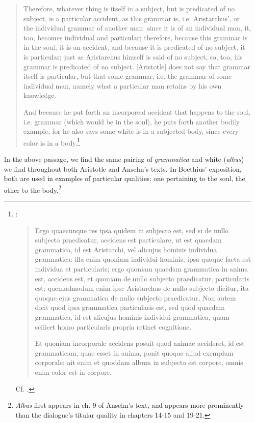 \documentclass[]{article}
\begin{document}
\begin{quote}
Therefore, whatever thing is itself in a subject, but is predicated of no subject, is a particular accident, as this grammar is, i.e. Aristarchus', or the individual grammar of another man: since it is of an individual man, it, too, becomes individual and particular; therefore, because this grammar is in the soul, it is an accident, and because it is predicated of no subject, it is particular; just as Aristarchus himself is said of no subject, so, too, his grammar is predicated of no subject. [Aristotle] does not say that grammar itself is particular, but that some grammar, i.e. the grammar of some individual man, namely what a particular man retains by his own knowledge.

And because he put forth an incorporeal accident that happens to the soul, i.e. grammar (which would be in the soul), he puts forth another bodily example; for he also says some white is in a subjected body, since every color is in a body.\footnote{\cite[BC 171D-172A]{BC}:
\begin{quote}
Ergo quaecunque res ipsa quidem in subjecto est, sed si de nullo subjecto praedicatur, accidens est particulare, ut est quaedam grammatica, id est Aristarchi, vel alicujus hominis individua grammatica: illa enim quoniam individui hominis, ipsa quoque facta est individua et particularis; ergo quoniam quaedam grammatica in anima est, accidens est, et quoniam de nullo subjecto praedicatur, particularis est; quemadmodum enim ipse Aristarchus de nullo subjecto dicitur, ita quoque ejus grammatica de nullo subjecto praedicatur. Non autem dicit quod ipsa grammatica particularis est, sed quod quaedam grammatica, id est alicujus hominis individui grammatica, quam scilicet homo particularis propria retinet cognitione. 

Et quoniam incorporale accidens posuit quod animae accideret, id est grammaticam, quae esset in anima, ponit quoque aliud exemplum corporale; ait enim et quoddam album in subjecto est corpore, omnis enim color est in corpore.
\end{quote}
Cf. \cite[BC 174A-175A; 246B-247B]{BC}.}
\end{quote}

In the above passage, we find the same pairing of \textit{grammatica} and white (\textit{albus}) we find throughout both Aristotle and Anselm's texts. In Boethius' exposition, both are used in examples of particular qualities: one pertaining to the soul, the other to the body.\footnote{\textit{Albus} first appears in ch. 9 of Anselm's text, and appears more prominently than the dialogue's titular quality in chapters 14-15 and 19-21.}
\end{document}
